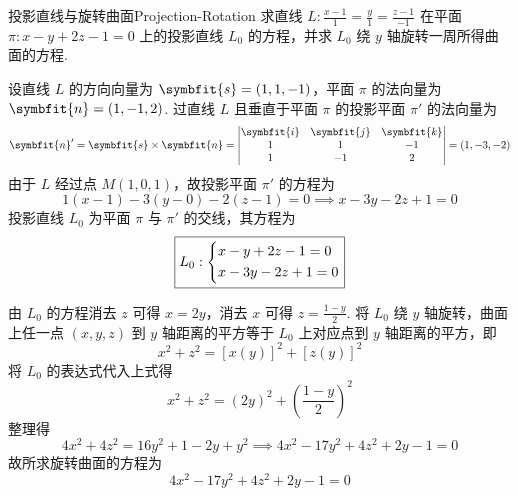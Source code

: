 \begin{problem}{投影直线与旋转曲面}{Projection-Rotation}
    求直线 $L : \frac{x-1}{1}=\frac{y}{1}=\frac{z-1}{-1}$ 在平面 $\pi : x-y+2z-1=0$ 上的投影直线 $L_0$ 的方程，并求 $L_0$ 绕 $y$ 轴旋转一周所得曲面的方程.
\end{problem}

\begin{solution}

    设直线 $L$ 的方向向量为 $\symbfit{s} = (1, 1, -1)$，平面 $\pi$ 的法向量为 $\symbfit{n} = (1, -1, 2)$.
    过直线 $L$ 且垂直于平面 $\pi$ 的投影平面 $\pi'$ 的法向量为
    \begin{equation}
        \symbfit{n}' = \symbfit{s} \times \symbfit{n} =
        \begin{vmatrix}
            \symbfit{i} & \symbfit{j} & \symbfit{k} \\
            1           & 1           & -1          \\
            1           & -1          & 2
        \end{vmatrix} = (1, -3, -2)
    \end{equation}
    由于 $L$ 经过点 $M(1, 0, 1)$，故投影平面 $\pi'$ 的方程为
    \begin{equation}
        1(x-1) - 3(y-0) - 2(z-1) = 0 \implies x - 3y - 2z + 1 = 0
    \end{equation}
    投影直线 $L_0$ 为平面 $\pi$ 与 $\pi'$ 的交线，其方程为
    \begin{equation}
        \boxed{L_0 : \begin{dcases} x - y + 2z - 1 = 0 \\ x - 3y - 2z + 1 = 0 \end{dcases}}
    \end{equation}


    由 $L_0$ 的方程消去 $z$ 可得 $x = 2y$，消去 $x$ 可得 $z = \frac{1-y}{2}$.
    将 $L_0$ 绕 $y$ 轴旋转，曲面上任一点 $(x, y, z)$ 到 $y$ 轴距离的平方等于 $L_0$ 上对应点到 $y$ 轴距离的平方，即
    \begin{equation}
        x^2 + z^2 = [x(y)]^2 + [z(y)]^2
    \end{equation}
    将 $L_0$ 的表达式代入上式得
    \begin{equation}
        x^2 + z^2 = (2y)^2 + \left( \frac{1-y}{2} \right)^2
    \end{equation}
    整理得
    \begin{equation}
        4x^2 + 4z^2 = 16y^2 + 1 - 2y + y^2 \implies 4x^2 - 17y^2 + 4z^2 + 2y - 1 = 0
    \end{equation}
    故所求旋转曲面的方程为
    \begin{equation}
        \boxed{4x^2 - 17y^2 + 4z^2 + 2y - 1 = 0}
    \end{equation}
\end{solution}


